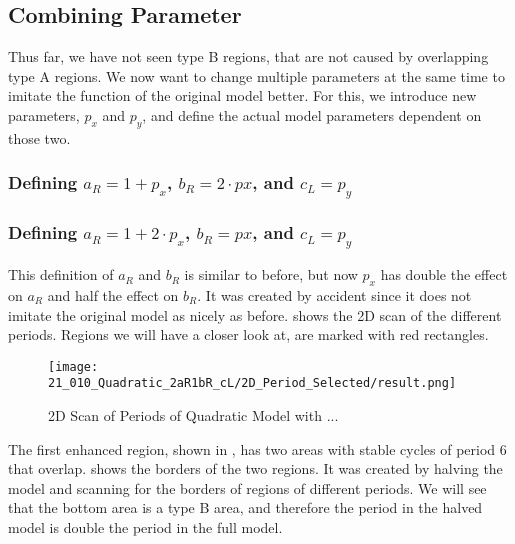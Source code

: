 \subsection{Combining Parameter}

Thus far, we have not seen type B regions, that are not caused by overlapping type A regions.
We now want to change multiple parameters at the same time to imitate the function of the original model better.
For this, we introduce new parameters, $p_x$ and $p_y$, and define the actual model parameters dependent on those two.

\subsubsection{Defining $a_R = 1 + p_x$, $b_R = 2 \cdot px$, and $c_L = p_y$}


\subsubsection{Defining $a_R = 1 + 2 \cdot p_x$, $b_R = px$, and $c_L = p_y$}

This definition of $a_R$ and $b_R$ is similar to before, but now $p_x$ has double the effect on $a_R$ and half the effect on $b_R$.
It was created by accident since it does not imitate the original model as nicely as before.
 shows the 2D scan of the different periods.
Regions we will have a closer look at, are marked with red rectangles.

\begin{figure}
    \centering
    \texttt{[image: 21\_010\_Quadratic\_2aR1bR\_cL/2D\_Period\_Selected/result.png]}
    \caption{2D Scan of Periods of Quadratic Model with ...}
    \label{fig:quadratic.full.2aR1bR_cL.2d.full}
\end{figure}

The first enhanced region, shown in , has two areas with stable cycles of period 6 that overlap.
 shows the borders of the two regions.
It was created by halving the model and scanning for the borders of regions of different periods.
We will see that the bottom area is a type B area, and therefore the period in the halved model is double the period in the full model.

